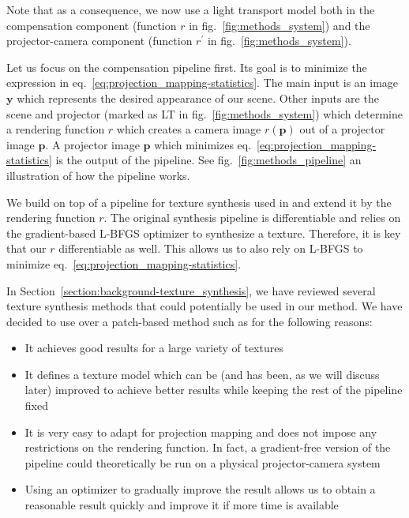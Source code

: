 Note that as a consequence, we now use a light transport model both in the compensation component (function \(r\) in fig.~\ref{fig:methods_system}) and the projector-camera component (function \(r^\prime\) in fig.~\ref{fig:methods_system}).

Let us focus on the compensation pipeline first. Its goal is to minimize the expression in eq.~\ref{eq:projection_mapping-statistics}. The main input is an image \(\bm{y}\) which represents the desired appearance of our scene. Other inputs are the scene and projector (marked as LT in fig.~\ref{fig:methods_system}) which determine a rendering function \(r\) which creates a camera image \(r(\bm{p})\) out of a projector image \(\bm{p}\). A projector image \(\bm{p}\) which minimizes eq.~\ref{eq:projection_mapping-statistics} is the output of the pipeline. See fig.~\ref{fig:methods_pipeline} an illustration of how the pipeline works.

We build on top of a pipeline for texture synthesis used in \citet{Gatys2015} and extend it by the rendering function \(r\). The original synthesis pipeline is differentiable and relies on the gradient-based L-BFGS optimizer to synthesize a texture. Therefore, it is key that our \(r\) differentiable as well. This allows us to also rely on L-BFGS to minimize eq.~\ref{eq:projection_mapping-statistics}.

In Section~\ref{section:background-texture_synthesis}, we have reviewed several texture synthesis methods that could potentially be used in our method. We have decided to use \citet{Gatys2015} over a patch-based method such as \citet{Efros2001} for the following reasons:

\begin{itemize}
    \item It achieves good results for a large variety of textures
    \item It defines a texture model which can be (and has been, as we will discuss later) improved to achieve better results while keeping the rest of the pipeline fixed
    \item It is very easy to adapt for projection mapping and does not impose any restrictions on the rendering function. In fact, a gradient-free version of the pipeline could theoretically be run on a physical projector-camera system
    \item Using an optimizer to gradually improve the result allows us to obtain a reasonable result quickly and improve it if more time is available
\end{itemize}

